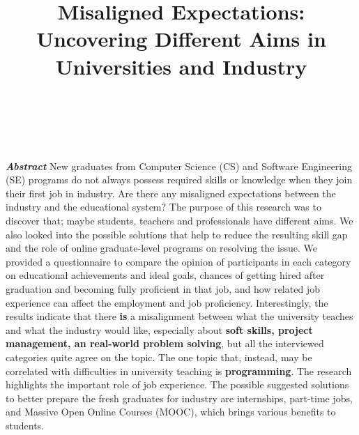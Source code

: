 \documentclass{sigchi}
\begin{document}
\title{Misaligned Expectations: \\ Uncovering Different Aims in Universities and Industry}

\author{%
  \\
  \\
}

\maketitle

\textbf{\textit{Abstract}}\newline
New graduates from Computer Science (CS) and Software Engineering (SE) programs do not always possess required skills or knowledge when they join their first job in industry. Are there any misaligned expectations between the industry and the educational system? The purpose of this research was to discover that; maybe students, teachers and professionals have different aims. We also looked into the possible solutions that help to reduce the resulting skill gap and the role of online graduate-level programs on resolving the issue. We provided a questionnaire to compare the opinion of participants in each category on educational achievements and ideal goals, chances of getting hired after graduation and becoming fully proficient in that job, and how related job experience can affect the employment and job proficiency. Interestingly, the results indicate that there \textbf{is} a misalignment between what the university teaches and what the industry would like, especially about \textbf{soft skills, project management, an real-world problem solving}, but all the interviewed categories quite agree on the topic. The one topic that, instead, may be correlated with difficulties in university teaching is \textbf{programming}. The research highlights the important role of job experience. The possible suggested solutions to better prepare the fresh graduates for industry are internships, part-time jobs, and Massive Open Online Courses (MOOC), which brings various benefits to students.
\end{document}
